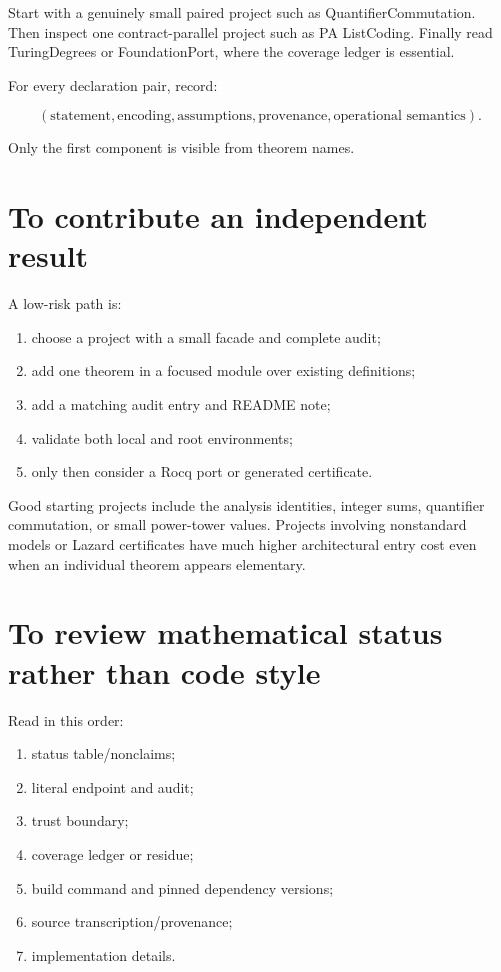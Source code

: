 \documentclass[
  10pt,
  a4paper,
  twoside,
  open=any,
  parskip=half,
  headings=big
]{scrreprt}
\begin{document}
Start with a genuinely small paired project such as QuantifierCommutation.
Then inspect one contract-parallel project such as PA ListCoding.  Finally read
TuringDegrees or FoundationPort, where the coverage ledger is essential.

For every declaration pair, record:

\[
(\text{statement},\text{encoding},\text{assumptions},\text{provenance},
\text{operational semantics}).
\]

Only the first component is visible from theorem names.

\section{To contribute an independent result}

A low-risk path is:

\begin{enumerate}
  \item choose a project with a small facade and complete audit;
  \item add one theorem in a focused module over existing definitions;
  \item add a matching audit entry and README note;
  \item validate both local and root environments;
  \item only then consider a Rocq port or generated certificate.
\end{enumerate}

Good starting projects include the analysis identities, integer sums,
quantifier commutation, or small power-tower values.  Projects involving
nonstandard models or Lazard certificates have much higher architectural
entry cost even when an individual theorem appears elementary.

\section{To review mathematical status rather than code style}

Read in this order:

\begin{enumerate}
  \item status table/nonclaims;
  \item literal endpoint and audit;
  \item trust boundary;
  \item coverage ledger or residue;
  \item build command and pinned dependency versions;
  \item source transcription/provenance;
  \item implementation details.
\end{enumerate}
\end{document}
